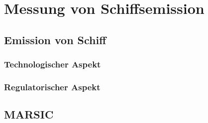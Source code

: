 
\chapter{Messung von Schiffsemission}


\section{Emission von Schiff}


\subsection{Technologischer Aspekt}


\subsection{Regulatorischer Aspekt}


\section{MARSIC}


